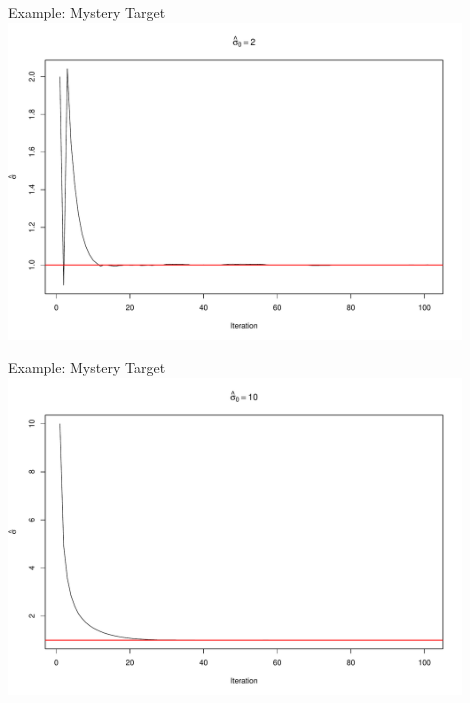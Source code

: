 \documentclass[14pt]{beamer}
\begin{document}
\begin{frame}{Example: Mystery Target}
    \centering
    \includegraphics[height=0.9\textheight, width=0.9\textwidth, keepaspectratio]{Figures/ESS Traj - 2.pdf}
\end{frame}

\begin{frame}{Example: Mystery Target}
    \centering
    \includegraphics[height=0.9\textheight, width=0.9\textwidth, keepaspectratio]{Figures/ESS Traj - 10.pdf}
\end{frame}


\end{document}
